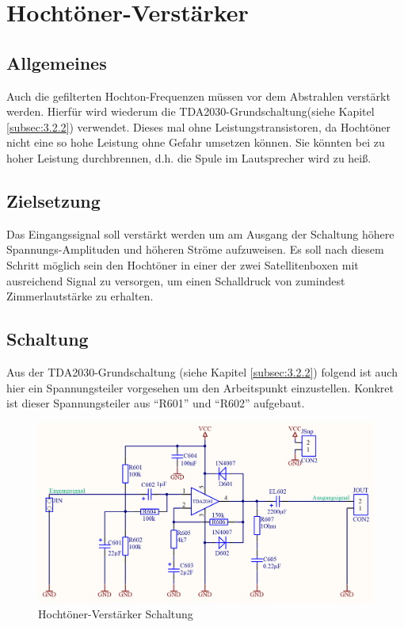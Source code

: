 \null\newpage
\section{Hochtöner-Verstärker}\label{sec:4.5}
\subsection{Allgemeines}\label{subsec:4.5.1}
Auch die gefilterten Hochton-Frequenzen müssen vor dem Abstrahlen verstärkt werden.
Hierfür wird wiederum die TDA2030-Grundschaltung(siehe Kapitel \ref{subsec:3.2.2}) verwendet.
Dieses mal ohne Leistungstransistoren, da Hochtöner nicht eine so hohe Leistung ohne Gefahr umsetzen können.
Sie könnten bei zu hoher Leistung durchbrennen, d.h. die Spule im Lautsprecher wird zu heiß.

\subsection{Zielsetzung}\label{subsec:4.5.2}
Das Eingangssignal soll verstärkt werden um am Ausgang der Schaltung höhere Spannungs-Amplituden und höheren Ströme aufzuweisen. Es soll nach diesem Schritt möglich sein den Hochtöner in einer der zwei Satellitenboxen mit ausreichend Signal zu versorgen, um einen Schalldruck von zumindest Zimmerlautstärke zu erhalten. 

\subsection{Schaltung}\label{subsec:4.5.3}
Aus der TDA2030-Grundschaltung (siehe Kapitel \ref{subsec:3.2.2}) folgend ist auch hier ein Spannungsteiler vorgesehen um den Arbeitspunkt einzustellen.
Konkret ist dieser Spannungsteiler aus \enquote{R601} und \enquote{R602} aufgebaut.

\begin{figure} [H]
	\centering	
	\includegraphics[width=1\textwidth]{img/Print6/HTVerstaerker-Schem.PNG}
	\caption{Hochtöner-Verstärker Schaltung}
	\label {fig:4.5.3.1}
\end{figure}

